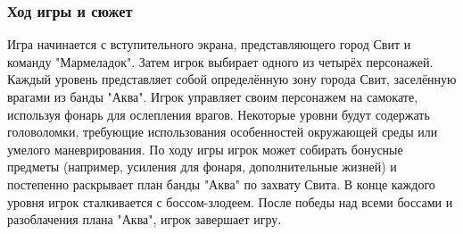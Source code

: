 \documentclass[article,12pt, fleqn]{article}
\begin{document}
\begin{itemize}
\subsubsection{Ход игры и сюжет}
Игра начинается с вступительного экрана, представляющего город Свит и команду "Мармеладок". Затем игрок выбирает одного из четырёх персонажей. Каждый уровень представляет собой определённую зону города Свит, заселённую врагами из банды "Аква". Игрок управляет своим персонажем на самокате, используя фонарь для ослепления врагов. Некоторые уровни будут содержать головоломки, требующие использования особенностей окружающей среды или умелого маневрирования. По ходу игры игрок может собирать бонусные предметы (например, усиления для фонаря, дополнительные жизней) и постепенно раскрывает план банды "Аква" по захвату Свита. В конце каждого уровня игрок сталкивается с боссом-злодеем. После победы над всеми боссами и разоблачения плана "Аква", игрок завершает игру. 

\end{itemize}
\end{document}
